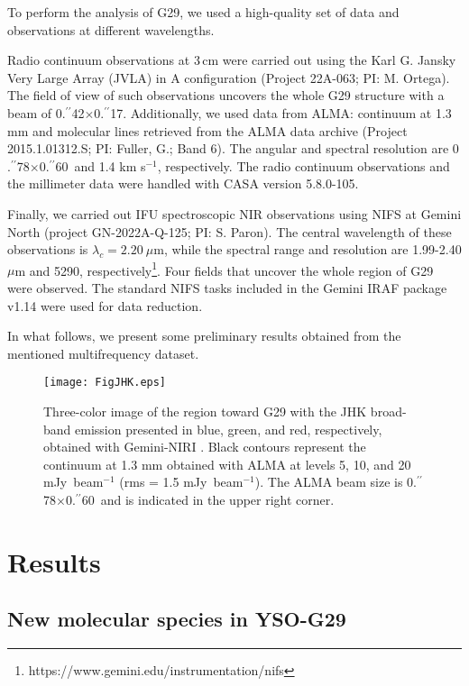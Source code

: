\documentclass[baaa]{baaa}
\begin{document}
To perform the analysis of G29, we used a high-quality set of data and observations at different wavelengths.

Radio continuum observations at 3\,cm were carried out using the Karl G. Jansky Very Large Array (JVLA) in A configuration (Project 22A-063; PI: M. Ortega). The field of view of such observations uncovers the whole G29 structure with a beam of 0$.\!\!^{\prime\prime}$42$\times$0$.\!\!^{\prime\prime}$17. Additionally, we used data from ALMA: continuum at 1.3 mm and molecular lines retrieved from the ALMA data archive (Project 2015.1.01312.S; PI: Fuller, G.; Band 6). The angular and spectral resolution are 0$.\!\!^{\prime\prime}$78$\times$0$.\!\!^{\prime\prime}$60~and 1.4 km s$^{-1}$, respectively. The radio continuum observations and the millimeter data were handled with CASA version 5.8.0-105.

Finally, we carried out IFU spectroscopic NIR observations using NIFS at Gemini North (project GN-2022A-Q-125; PI: S. Paron). The central wavelength of these observations is $\lambda_{c} = 2.20~\mu$m, while the spectral range and resolution are 1.99-2.40 $\mu$m and 5290, respectively\footnote{https://www.gemini.edu/instrumentation/nifs}. Four fields that uncover the whole region of G29 were observed. The standard NIFS tasks included in the Gemini IRAF package v1.14 were used for data reduction.

In what follows, we present some preliminary results obtained from the mentioned multifrequency dataset. 


\begin{figure}
    \centering
    \texttt{[image: FigJHK.eps]}
    \caption{Three-color image of the region toward G29 with the JHK broad-band emission presented in blue, green, and red, respectively, obtained with Gemini-NIRI \citep{areal20}. Black contours represent the continuum at 1.3 mm obtained with ALMA at levels 5, 10, and 20 mJy~beam$^{-1}$ (rms = 1.5 mJy~beam$^{-1}$). The ALMA beam size is 0$.\!\!^{\prime\prime}$78$\times$0$.\!\!^{\prime\prime}$60~and is indicated in the upper right corner.}
    \label{g29}
\end{figure}

\section{Results}\label{res}

\subsection{New molecular species in YSO-G29}
\end{document}
